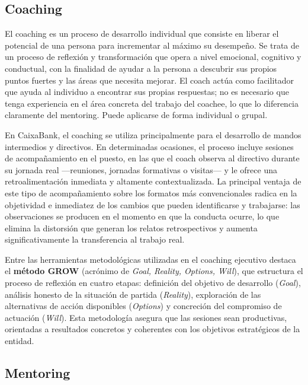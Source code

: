 \subsection{Coaching}

El coaching es un proceso de desarrollo individual que consiste en liberar el potencial de una
persona para incrementar al máximo su desempeño. Se trata de un proceso de reflexión y
transformación que opera a nivel emocional, cognitivo y conductual, con la finalidad de
ayudar a la persona a descubrir sus propios puntos fuertes y las áreas que necesita mejorar.
El coach actúa como facilitador que ayuda al individuo a encontrar sus propias respuestas;
no es necesario que tenga experiencia en el área concreta del trabajo del coachee, lo que
lo diferencia claramente del mentoring. Puede aplicarse de forma individual o grupal.

En CaixaBank, el coaching se utiliza principalmente para el desarrollo de mandos intermedios
y directivos. En determinadas ocasiones, el proceso incluye sesiones de acompañamiento en el
puesto, en las que el coach observa al directivo durante su jornada real —reuniones, jornadas
formativas o visitas— y le ofrece una retroalimentación inmediata y altamente contextualizada.
La principal ventaja de este tipo de acompañamiento sobre los formatos más convencionales radica
en la objetividad e inmediatez de los cambios que pueden identificarse y trabajarse: las
observaciones se producen en el momento en que la conducta ocurre, lo que elimina la distorsión
que generan los relatos retrospectivos y aumenta significativamente la transferencia al trabajo real.

Entre las herramientas metodológicas utilizadas en el coaching ejecutivo destaca
el \textbf{método GROW} (acrónimo de \textit{Goal, Reality, Options, Will}), que estructura
el proceso de reflexión en cuatro etapas: definición del objetivo de desarrollo
(\textit{Goal}), análisis honesto de la situación de partida (\textit{Reality}), exploración
de las alternativas de acción disponibles (\textit{Options}) y concreción del compromiso de
actuación (\textit{Will}). Esta metodología asegura que las sesiones sean productivas,
orientadas a resultados concretos y coherentes con los objetivos estratégicos de la entidad.

\subsection{Mentoring}

